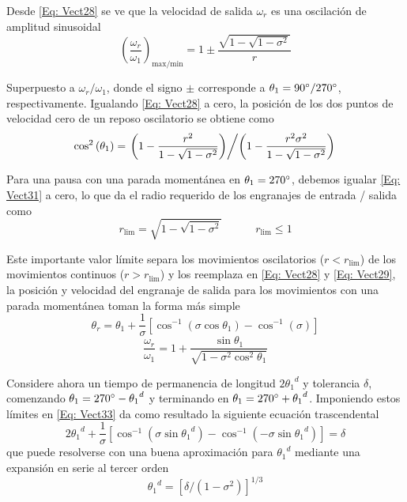 \documentclass[12pt, final]{extarticle}
\begin{document}
Desde \eqref{Eq: Vect28} se ve que la velocidad de salida $\omega_r$ es una
oscilación de amplitud sinusoidal
\begin{equation}
   (\frac{\omega_r}{\omega_1})_{\text{max/min}}=1 \pm \frac{\sqrt{1-\sqrt{1-{\sigma}^2}}}{r}
   \label{Eq: Vect30}
\end{equation}

Superpuesto a $\omega_r / \omega_1$, donde el signo $\pm$ corresponde a
$\theta_1= 90\degree / 270\degree$, respectivamente. Igualando \eqref{Eq:
Vect28} a cero, la posición de los dos puntos de velocidad cero de un reposo
oscilatorio se obtiene como
\begin{equation}
   \cos^{2}{(\theta_1)}=\left.\left(1-\frac{{r}^2}{1-\sqrt{1-{\sigma}^2}}\right)\middle/\left(1-\frac{{r}^2{\sigma}^2}{1-\sqrt{1-{\sigma}^2}}\right)\right.
   \label{Eq: Vect31}
\end{equation}

Para una pausa con una parada momentánea en $\theta_1= 270\degree$, debemos
igualar \eqref{Eq: Vect31} a cero, lo que da el radio requerido de los
engranajes de entrada / salida como
\begin{equation}
   r_{\text{lim}}=\sqrt{1-\sqrt{1-{\sigma}^2}} \quad\quad\quad  r_{\text{lim}} \leq 1
   \label{Eq: Vect32}
\end{equation}

Este importante valor límite separa los movimientos oscilatorios ($r <
r_{\text{lim}}$) de los movimientos continuos ($r > r_{\text{lim}}$) y los
reemplaza en \eqref{Eq: Vect28} y \eqref{Eq: Vect29}, la posición y velocidad
del engranaje de salida para los movimientos con una parada momentánea toman la
forma más simple
\begin{equation}
   \theta_r=\theta_1+\frac{1}{\sigma}[\cos^{-1}{(\sigma\cos{\theta_1})}-\cos^{-1}{(\sigma)}]
   \label{Eq: Vect33}
\end{equation}
\begin{equation}
   \frac{\omega_r}{\omega_1}=1+\frac{\sin{\theta_1}}{\sqrt{1-{\sigma}^2\cos^{2}{\theta_1}}}
   \label{Eq: Vect34}
\end{equation}

Considere ahora un tiempo de permanencia de longitud $2{\theta_1}^d$ y
tolerancia $\delta$, comenzando $\theta_1=270\degree-{\theta_1}^d$ y terminando
en $\theta_1=270\degree+{\theta_1}^d$. Imponiendo estos límites en \eqref{Eq:
Vect33} da como resultado la siguiente ecuación trascendental
\begin{equation}
   2{\theta_1}^d + \frac{1}{\sigma}[\cos^{-1}{(\sigma\sin{{\theta_1}^d})} - \cos^{-1}{(-\sigma\sin{{\theta_1}^d})}]= \delta
   \label{Eq: Vect35}
\end{equation}
que puede resolverse con una buena aproximación para ${\theta_1}^d$ mediante una
expansión en serie al tercer orden
\begin{equation}
   {\theta_1}^d=[\delta/(1-{\sigma}^2)]^{1/3}
   \label{Eq: Vect36}
\end{equation}
\end{document}
